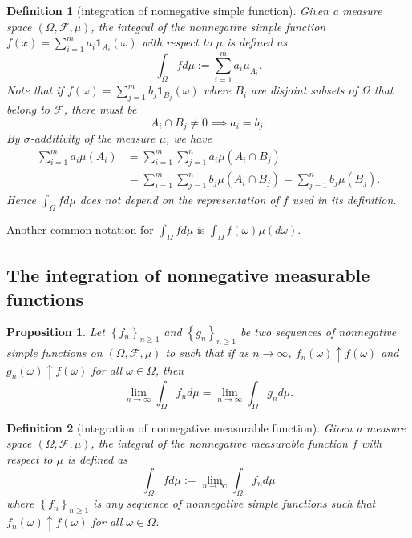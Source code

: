 \documentclass{report}
\newtheorem{definition}{Definition}[section]
\newtheorem{proposition}{Proposition}[section]
\theoremstyle{nonumberplain}
\begin{document}
\begin{definition}[integration of nonnegative simple function]
	Given a measure space $(\Omega, \mathcal{F},\mu)$, the integral of the nonnegative simple function $f(x)=\sum_{i=1}^ma_i\mathbf{1}_{A_i}(\omega)$ with respect to $\mu$
	is defined as
	\[
	\int_\Omega fd\mu:=\sum_{i=1}^ma_i\mu_{A_i}.
	\]
	Note that if $f(\omega)=\sum_{j=1}^mb_j\mathbf{1}_{B_j}(\omega)$ where $B_i$ are disjoint subsets
	of $\Omega$ that belong to $\mathcal{F}$, there must be
	\[
	A_{i} \cap B_{j} \neq 0\implies a_{i}=b_{j}.
	\]
	By $\sigma$-additivity of the measure $\mu$, we have
	\[
	\begin{aligned}
		\sum_{i=1}^{m} a_{i} \mu\left(A_{i}\right) &=\sum_{i=1}^{m} \sum_{j=1}^{n} a_{i} \mu\left(A_{i} \cap B_{j}\right) \\
		&=\sum_{i=1}^{m} \sum_{j=1}^{n} b_{j} \mu\left(A_{i} \cap B_{j}\right)=\sum_{j=1}^{n} b_{j} \mu\left(B_{j}\right).
	\end{aligned}
	\]
	Hence $\int_\Omega fd\mu$ does not depend on the representation of $f$ used in its definition. 
\end{definition}
Another common notation for $\int_\Omega fd\mu$ is $\int_\Omega f(\omega)\mu(d\omega)$.
\subsection{The integration of nonnegative measurable functions}
\begin{proposition}
	Let $\left\{f_{n}\right\}_{n \ge 1}$ and $\left\{g_{n}\right\}_{n \ge 1}$ be two sequences of nonnegative simple functions on $(\Omega, \mathcal{F}, \mu)$ to such that if as $n \rightarrow \infty$, $f_{n}(\omega) \uparrow f(\omega)$ and $g_{n}(\omega) \uparrow f(\omega)$ for all $\omega \in \Omega$, then
	\[
	\lim_{n \rightarrow \infty} \int_\Omega f_{n} d \mu=\lim _{n \rightarrow \infty} \int_\Omega g_{n} d \mu.
	\]
\end{proposition}



\begin{definition}[integration of nonnegative measurable function]
	Given a measure space $(\Omega, \mathcal{F},\mu)$, the integral of the nonnegative measurable function $f$ with respect to $\mu$
	is defined as
	\[
	\int_\Omega fd\mu:=\lim _{n \rightarrow \infty} \int_\Omega f_{n} d \mu
	\]
	where $\left\{f_{n}\right\}_{n \geq 1}$ is any sequence of nonnegative simple functions such that $f_{n}(\omega) \uparrow f(\omega)$ for all $\omega\in\Omega$.
\end{definition}
\end{document}
